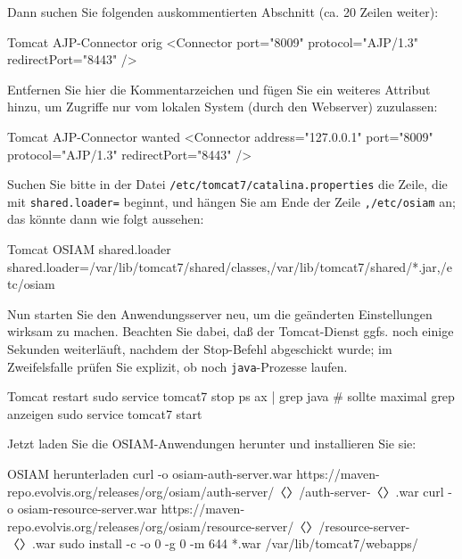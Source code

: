 \begin{minipage}{\textwidth}
Dann suchen Sie folgenden auskommentierten Abschnitt (ca. 20 Zeilen weiter):

\begin{lstdump}[language=XML]{Tomcat AJP-Connector orig}
<Connector port="8009" protocol="AJP/1.3" redirectPort="8443" />
\end{lstdump}

Entfernen Sie hier die Kommentarzeichen und fügen Sie ein weiteres Attribut
hinzu, um Zugriffe nur vom lokalen System (durch den Webserver) zuzulassen:

\begin{lstdump}[language=XML]{Tomcat AJP-Connector wanted}
<Connector address="127.0.0.1" port="8009" protocol="AJP/1.3" redirectPort="8443" />
\end{lstdump}
\end{minipage}

\begin{minipage}{\textwidth}
Suchen Sie bitte in der Datei \texttt{/etc/tomcat7/catalina.properties}
die Zeile, die mit \texttt{shared.loader=} beginnt, und hängen Sie am
Ende der Zeile \texttt{,/etc/osiam} an; das könnte dann wie folgt aussehen:

\begin{lstdump}{Tomcat OSIAM shared.loader}
shared.loader=/var/lib/tomcat7/shared/classes,/var/lib/tomcat7/shared/*.jar,/etc/osiam
\end{lstdump}
\end{minipage}

Nun starten Sie den Anwendungsserver neu, um die geänderten
Einstellungen wirksam zu machen. Beachten Sie dabei, daß der
Tomcat-Dienst ggfs. noch einige Sekunden weiterläuft, nachdem
der Stop-Befehl abgeschickt wurde; im Zweifelsfalle prüfen Sie
explizit, ob noch \texttt{java}-Prozesse laufen.\keinumbruch

\begin{minipage}{\textwidth}
\begin{lstdump}{Tomcat restart}
sudo service tomcat7 stop
ps ax | grep java # sollte maximal grep anzeigen
sudo service tomcat7 start
\end{lstdump}
\end{minipage}

\begin{minipage}{\textwidth}
Jetzt laden Sie die OSIAM-Anwendungen herunter und installieren Sie sie:

\begin{lstdump}{OSIAM herunterladen}
curl -o osiam-auth-server.war https://maven-repo.evolvis.org/releases/org/osiam/auth-server/〈\lstdumpesc{\vwiaversosiam}〉/auth-server-〈\lstdumpesc{\vwiaversosiam}〉.war
curl -o osiam-resource-server.war https://maven-repo.evolvis.org/releases/org/osiam/resource-server/〈\lstdumpesc{\vwiaversosiam}〉/resource-server-〈\lstdumpesc{\vwiaversosiam}〉.war
sudo install -c -o 0 -g 0 -m 644 *.war /var/lib/tomcat7/webapps/
\end{lstdump}
\end{minipage}

